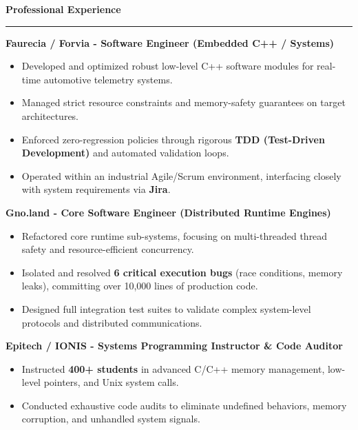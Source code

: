 \documentclass[9pt]{extarticle}
\begin{document}
\par\vspace{5pt}

{\large\bfseries Professional Experience}
\par\vspace{-8pt}
\rule{\linewidth}{0.4pt}
\par\vspace{5pt}

{\bfseries Faurecia / Forvia - Software Engineer (Embedded C++ / Systems)}
\begin{itemize}[noitemsep, topsep=0pt]
    \item Developed and optimized robust low-level C++ software modules for real-time automotive telemetry systems.
    \item Managed strict resource constraints and memory-safety guarantees on target architectures.
    \item Enforced zero-regression policies through rigorous {\bfseries TDD (Test-Driven Development)} and automated validation loops.
    \item Operated within an industrial Agile/Scrum environment, interfacing closely with system requirements via {\bfseries Jira}.
\end{itemize}

\par\vspace{5pt}

{\bfseries Gno.land - Core Software Engineer (Distributed Runtime Engines)}
\begin{itemize}[noitemsep, topsep=0pt]
    \item Refactored core runtime sub-systems, focusing on multi-threaded thread safety and resource-efficient concurrency.
    \item Isolated and resolved {\bfseries 6 critical execution bugs} (race conditions, memory leaks), committing over 10,000 lines of production code.
    \item Designed full integration test suites to validate complex system-level protocols and distributed communications.
\end{itemize}

\par\vspace{5pt}

{\bfseries Epitech / IONIS - Systems Programming Instructor \& Code Auditor}
\begin{itemize}[noitemsep, topsep=0pt]
    \item Instructed {\bfseries 400+ students} in advanced C/C++ memory management, low-level pointers, and Unix system calls.
    \item Conducted exhaustive code audits to eliminate undefined behaviors, memory corruption, and unhandled system signals.
\end{itemize}
\end{document}

